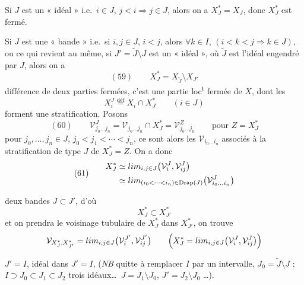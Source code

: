 \documentclass[11pt,a4paper]{article}
\begin{document}

Si $J$ est un « idéal » i.e.\ $i\in J$, $j<i\Rightarrow j\in J$, alors on a $X_J^{*}=X_J$, donc $X_J^{*}$ est fermé.

Si $J$ est une « bande » i.e.\ si $i,j\in J$, $i<j$, alors $\forall k\in I$, $(i<k<j\Rightarrow k\in J)$, ou ce qui revient au même, si $J'=\widetilde J\setminus J$ est un « idéal », où $\widetilde J$ est l'idéal engendré par $J$, alors on a
\[
(59)\qquad X_J^{*}=X_{\widetilde J}\setminus X_{J'}
\]
différence de deux parties fermées, c'est une partie loc\textsuperscript{t} fermée de $X$, dont les
\[
X_i^{J}\overset{\text{déf}}{=}X_i\cap X_J^{*}\qquad(i\in J)
\]
forment une stratification. Posons
\[
(60)\qquad \mathcal V^{J}_{j_0\ldots j_n}=\mathcal V_{j_0\ldots j_n}\cap X_J^{*}=\mathcal V^{Z}_{j_0\ldots j_n}\qquad\text{pour } Z=X_J^{*}
\]
pour $j_0,\ldots,j_n\in J$, $j_0<j_1<\cdots<j_n$, \struck{\ill{}} ce sont alors les $\mathcal V_{i_0\ldots i_n}$ associés à la stratification de type $J$ de $X_J^{*}=Z$. On a donc
\[
(61)\qquad
\begin{aligned}
X_J^{*}&\simeq\varinjlim_{i,j\in J}\bigl(\mathcal V_i^{J},\mathcal V_{ij}^{J}\bigr)\\
&\simeq\varinjlim_{(i_0<\cdots<i_n)\in\mathrm{Drap}(J)}\bigl(\mathcal V^{J}_{i_0\ldots i_n}\bigr)
\end{aligned}
\]


deux bandes $J\subset J'$, d'où
\[
X_J^{*}\subset X_{J'}^{*}
\]
et on prendra le voisinage tubulaire de $X_J^{*}$ dans $X_{J'}^{*}$, on trouve
\[
\mathcal V_{X_J^{*},X_{J'}^{*}}=\varinjlim_{i,j\in J}\bigl(\mathcal V_i^{J'},\mathcal V_{ij}^{J'}\bigr)\qquad\Bigl(X_J^{*}=\varinjlim_{i,j\in J}\bigl(\mathcal V_i^{J},\mathcal V_{ij}^{J}\bigr)\Bigr)
\]

  $J'=I$,  idéal dans $J'=I$, (\emph{NB} quitte à remplacer $I$ par un intervalle, $J_0=\widetilde J\setminus J$ ; \struck{\ill{}}  $I\supset J_0\subset J_1\subset J_2$ trois idéaux\ldots\ $J=J_1\setminus J_0$, $J'=J_2\setminus J_0$ \ldots).
\end{document}
